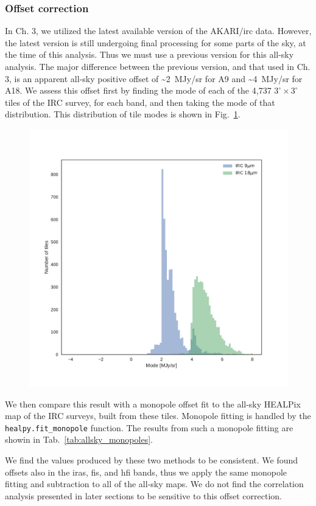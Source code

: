     \subsubsection{Offset correction}
    In Ch. 3, we utilized the latest available version of the AKARI/\acrshort{irc} data. However, the latest version is still undergoing final processing for some parts of the sky, at the time of this analysis. Thus we must use a previous version for this all-sky analysis. The major difference between the previous version, and that used in Ch. 3, is an apparent all-sky positive offset of \textasciitilde{}2~MJy/sr for A9 and \textasciitilde{}4~MJy/sr for A18. We assess this offset first by finding the mode of each of the 4,737 $3^{\circ}\times3^{\circ}$ tiles of the IRC survey, for each band, and then taking the mode of that distribution. This distribution of tile modes is shown in Fig.~\ref{fig:allsky_2016_tilemodes}.
        \begin{figure}
          \includegraphics[width=\textwidth]{../Plots/ch_allsky/IRC_offset_correction.pdf}
          \centering
          \caption{}
          \label{fig:allsky_2016_tilemodes}
        \end{figure}
      We then compare this result with a monopole offset fit to the all-sky HEALPix map of the IRC surveys, built from these tiles. Monopole fitting is handled by the {\tt healpy.fit\_monopole} function. The results from such a monopole fitting are showin in Tab.~\ref{tab:allsky_monopoles}.
        \begin{table}
          \centering
          \caption{}
          \label{tab:allsky_monopoles}
        \end{table}
      We find the values produced by these two methods to be consistent. We found offsets also in the \acrshort{iras}, \acrshort{fis}, and \acrshort{hfi} bands, thus we apply the same monopole fitting and subtraction to all of the all-sky maps. We do not find the correlation analysis presented in later sections to be sensitive to this offset correction.

